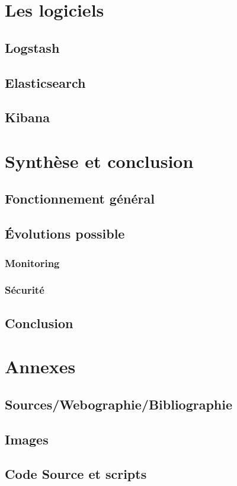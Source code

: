 \documentclass[a4paper,12pt,one side,titlepage]{report}
\begin{document}
\part{Les logiciels}
\chapter{Logstash}


\chapter{Elasticsearch}


\chapter{Kibana}


\part{Synthèse et conclusion}
\chapter{Fonctionnement général}

\chapter{Évolutions possible}
\section{Monitoring}
\section{Sécurité}

\chapter{Conclusion}

\part{Annexes}
\chapter{Sources/Webographie/Bibliographie}

\chapter{Images}

\chapter{Code Source et scripts}




\printglossaries
\end{document}
